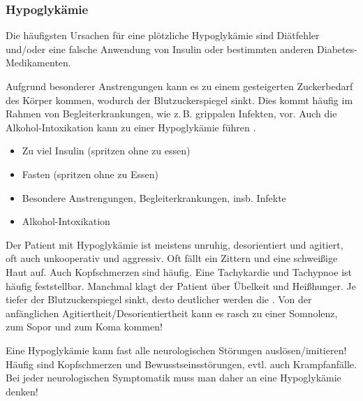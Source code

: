 {\subsubsection{Hypoglykämie}
\label{topic:hypoglykaemie}



{%
Die häufigsten Ursachen für eine plötzliche Hypoglykämie
sind Diätfehler und/oder eine falsche Anwendung von Insulin
oder bestimmten anderen Diabetes-Medikamenten. 

Aufgrund
besonderer Anstrengungen kann es zu einem gesteigerten
Zuckerbedarf des Körper kommen, wodurch der
Blutzuckerspiegel sinkt. Dies kommt häufig im Rahmen von
Begleiterkrankungen, wie z.\,B. grippalen Infekten, vor.
Auch die Alkohol-Intoxikation kann zu einer Hypoglykämie
führen \citep{LoefflerBiochemie7}. 
\bigskip
}{%
\begin{itemize}
  \item Zu viel Insulin (spritzen ohne zu essen)
  \item Fasten (spritzen ohne zu Essen)
  \item Besondere Anstrengungen, Begleiterkrankungen,
  insb. Infekte
  \item Alkohol-Intoxikation
\end{itemize}
}{}{}{}






{%
Der Patient mit Hypoglykämie ist meistens unruhig,
desorientiert und agitiert, oft auch unkooperativ und
aggressiv. Oft fällt ein Zittern und eine schweißige Haut
auf. Auch Kopfschmerzen sind häufig. Eine Tachykardie und
Tachypnoe ist häufig feststellbar. Manchmal klagt der
Patient über Übelkeit und Heißhunger.
Je tiefer der Blutzuckerspiegel sinkt, desto deutlicher
werden die . Von der anfänglichen
Agitiertheit/Desorientiertheit kann es rasch zu einer
Somnolenz, zum Sopor und zum Koma kommen!

Eine Hypoglykämie kann fast alle neurologischen  Störungen
aus\-lösen/imitieren! Häufig sind Kopfschmerzen und
Bewusstseinsstörungen, evtl. auch Krampfanfälle. Bei jeder
neurologischen Symptomatik muss man daher an eine
Hypoglykämie denken!


}}
